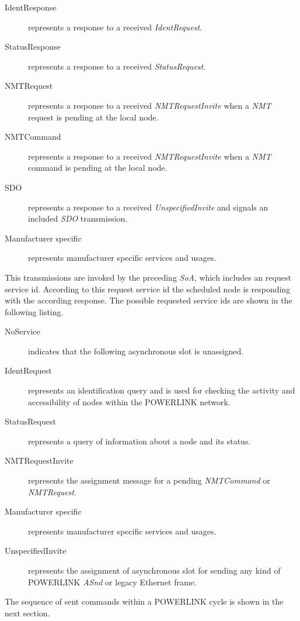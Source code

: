 \begin{description}
    \item[IdentResponse] represents a response to a received \emph{IdentRequest}.
    \item[StatusResponse] represents a response to a received \emph{StatusRequest}.
    \item[NMTRequest] represents a response to a received \emph{NMTRequestInvite} when a \emph{NMT} request is pending at the local node.
    \item[NMTCommand] represents a response to a received \emph{NMTRequestInvite} when a \emph{NMT} command is pending at the local node.
    \item[SDO] represents a response to a received \emph{UnspecifiedInvite} and signals an included \emph{SDO} transmission.
    \item[Manufacturer specific] represents manufacturer specific services and usages.
\end{description}

This transmissions are invoked by the preceding \emph{SoA}, which includes an request service id.
According to this request service id the scheduled node is responding with the according response.
The possible requested service ids are shown in the following listing. \cite[section 4.6.1.1.5.1]{epsg_epsg_2013}

\begin{description}
    \item[NoService] indicates that the following asynchronous slot is unassigned.
    \item[IdentRequest] represents an identification query and is used for checking the activity and accessibility of nodes within the POWERLINK network.
    \item[StatusRequest] represents a query of information about a node and its status.
    \item[NMTRequestInvite] represents the assignment message for a pending \emph{NMTCommand} or \emph{NMTRequest}.
    \item[Manufacturer specific] represents manufacturer specific services and usages.
    \item[UnspecifiedInvite] represents the assignment of asynchronous slot for sending any kind of POWERLINK \emph{ASnd} or legacy Ethernet frame.
\end{description}

The sequence of sent commands within a POWERLINK cycle is shown in the next section.

